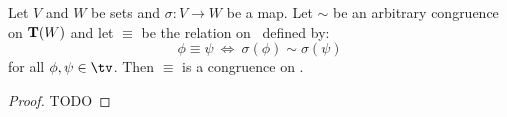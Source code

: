 \begin{prop}\label{logic:prop:LAM:substitution:congruence}
    Let $V$ and $W$ be sets and $\sigma:V\to W$ be a map. Let $\sim$ be
    an arbitrary congruence on ${\bf T}(W)$ and let $\equiv$ be the
    relation on \tv\ defined by:
    \[
        \phi\equiv\psi\ \Leftrightarrow\ \sigma(\phi)\sim\sigma(\psi)
    \]
    for all $\phi,\psi\in\tv$. Then $\equiv$ is a congruence on \tv.
\end{prop}
\begin{proof}
TODO
\end{proof}

